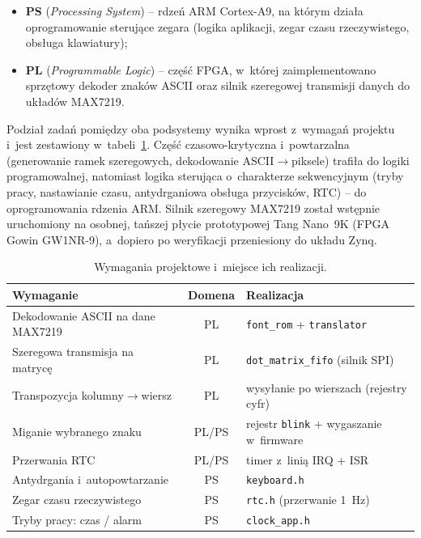 \documentclass[12pt,a4paper]{article}
\begin{document}
\begin{itemize}[noitemsep]
    \item \textbf{PS} (\emph{Processing System}) -- rdzeń ARM Cortex-A9,
          na którym działa oprogramowanie sterujące zegara (logika
          aplikacji, zegar czasu rzeczywistego, obsługa klawiatury);
    \item \textbf{PL} (\emph{Programmable Logic}) -- część FPGA, w~której
          zaimplementowano sprzętowy dekoder znaków ASCII oraz silnik
          szeregowej transmisji danych do układów MAX7219.
\end{itemize}

Podział zadań pomiędzy oba podsystemy wynika wprost z~wymagań projektu i~jest
zestawiony w~tabeli~\ref{tab:wymagania}. Część czasowo-krytyczna i~powtarzalna
(generowanie ramek szeregowych, dekodowanie ASCII$\rightarrow$piksele) trafiła
do logiki programowalnej, natomiast logika sterująca o~charakterze sekwencyjnym
(tryby pracy, nastawianie czasu, antydrganiowa obsługa przycisków, RTC) --
do oprogramowania rdzenia ARM. Silnik szeregowy MAX7219 został wstępnie
uruchomiony na osobnej, tańszej płycie prototypowej Tang Nano~9K (FPGA Gowin
GW1NR-9), a~dopiero po weryfikacji przeniesiony do układu Zynq.

\begin{table}[H]
\centering
\caption{Wymagania projektowe i~miejsce ich realizacji.}
\label{tab:wymagania}
\small
\begin{tabularx}{\textwidth}{@{}p{5.2cm} c X@{}}
\toprule
\textbf{Wymaganie} & \textbf{Domena} & \textbf{Realizacja} \\
\midrule
Dekodowanie ASCII na dane MAX7219 & PL & \texttt{font\_rom} + \texttt{translator} \\
Szeregowa transmisja na matrycę    & PL & \texttt{dot\_matrix\_fifo} (silnik SPI) \\
Transpozycja kolumny$\rightarrow$wiersz & PL & wysyłanie po wierszach (rejestry cyfr) \\
Miganie wybranego znaku            & PL/PS & rejestr \texttt{blink} + wygaszanie w~firmware \\
Przerwania RTC                     & PL/PS & timer z~linią IRQ + ISR \\
Antydrgania i~autopowtarzanie      & PS & \texttt{keyboard.h} \\
Zegar czasu rzeczywistego          & PS & \texttt{rtc.h} (przerwanie 1~Hz) \\
Tryby pracy: czas / alarm          & PS & \texttt{clock\_app.h} \\
\bottomrule
\end{tabularx}
\end{table}
\end{document}

